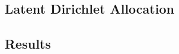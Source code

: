 \documentclass[conference]{IEEEtran}
\begin{document}
\subsection{Latent Dirichlet Allocation}

\subsection{Results}


%
%



%
%
\end{document}
